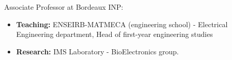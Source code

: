 

\begin{cvparagraph}

Associate Professor at Bordeaux INP:
\begin{itemize}
	\item \textbf{Teaching:} ENSEIRB-MATMECA (engineering school) - Electrical Engineering department, Head of first-year engineering studies
	\item \textbf{Research:} IMS Laboratory - BioElectronics group.
\end{itemize}
\end{cvparagraph}